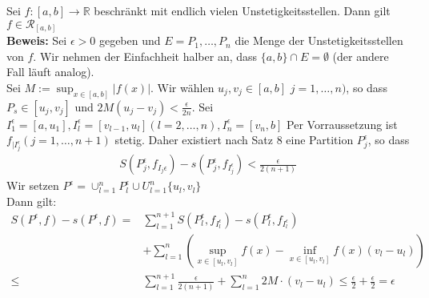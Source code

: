 \begin{Satz}{
	Sei $f: [a,b] \rightarrow \mathbb{R}$ beschränkt mit endlich vielen 
	Unstetigkeitsstellen. Dann gilt $f \in \mathcal{R}_{[a,b]}$\\
	\textbf{Beweis:} Sei $\epsilon > 0$ gegeben und $E = {P_1, \hdots, P_n}$
	die Menge der Unstetigkeitsstellen von $f$. Wir nehmen der Einfachheit halber 
	an, dass $\{a,b\} \cap E = \emptyset$ (der andere Fall läuft analog).\\
	Sei $M:= \sup_{x \in [a,b]} \vert f(x) \vert$. Wir wählen $u_j, v_j \in [a,b]$ 
	$j = 1, \hdots, n)$, so dass $P_s \in [u_j, v_j]$ und $2M (u_j - v_j) < 
	\frac{\epsilon}{2n}$. Sei $I_1^{\epsilon} = [a, u_1], I_l^{\epsilon} = [v_{l-1}, 
	u_l] (l = 2, \hdots, n), I_n^{\epsilon} = [v_n, b]$ 
	Per Vorraussetzung ist $f_{\vert I_j^{\epsilon}} (j = 1,\hdots, n+1)$ stetig.
	Daher existiert nach Satz 8 %
	eine Partition $P_j^{\epsilon}$, so dass 
	\begin{align*}
		S(P_j^{\epsilon}, f_{I_j{\epsilon}}) - s(P_j^{\epsilon}, f_{I_j^{\epsilon}}) 
		 < \frac{\epsilon}{2(n+1)}
	\end{align*}
	Wir setzen $P^{\epsilon} = \cup_{l = 1}^n P_l^{\epsilon}
	 \cup U_{l=1}^n\{u_l,v_l\}$\\
	 Dann gilt:
	 \begin{align*}
	 	S(P^{\epsilon},f) - s(P^{\epsilon},f) 
	 	= & \sum_{l=1}^{n+1} S(P_l^{\epsilon},f_{I_l^{\epsilon}}) - 
	 		s(P_l^{\epsilon},f_{I_l^{\epsilon}})  \\
	 		& + \sum_{l = 1}^n \left( \sup_{x \in [u_l, v_l]} 
	 		f(x) - \inf_{x \in [u_l, v_l]} f(x) (v_l - u_l)\right) \\
	 		\leq & \sum_{l=1}^{n+1} \frac{\epsilon}{2(n+1)} + \sum_{l=1}^n
	 			2M \cdot(v_l-u_l) \leq \frac{\epsilon}{2} + \frac{\epsilon}{2} 
	 			= \epsilon
	 \end{align*}	 
}\end{Satz}

